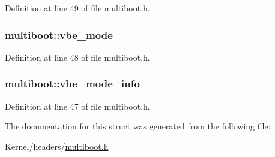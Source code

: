 Definition at line 49 of file multiboot.h.

\hypertarget{structmultiboot_ad8f35f9f97ad5bd1a1e5064b03f3f491}{
\subsubsection[{vbe\_\-mode}]{ {\bf multiboot::vbe\_\-mode}}}
\label{structmultiboot_ad8f35f9f97ad5bd1a1e5064b03f3f491}


Definition at line 48 of file multiboot.h.

\hypertarget{structmultiboot_a60d40543e0871a28e7e386241124bc17}{
\subsubsection[{vbe\_\-mode\_\-info}]{ {\bf multiboot::vbe\_\-mode\_\-info}}}
\label{structmultiboot_a60d40543e0871a28e7e386241124bc17}


Definition at line 47 of file multiboot.h.



The documentation for this struct was generated from the following file:\begin{DoxyCompactItemize}
\item 
Kernel/headers/\hyperlink{multiboot_8h}{multiboot.h}\end{DoxyCompactItemize}
